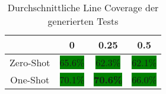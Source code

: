 \bgroup
\def\arraystretch{2}
\begin{table}[H]
	\vspace{.5cm}
	\centering		
	\begin{center}
		\begin{tabular}{|c||c|c|c|}
			\hline 
			& 0 & 0.25 & 0.5 \\
			\hline 
			\hline
			Zero-Shot & \colorbox{green}{65.6\%} & \colorbox{green}{62.3\%} & \colorbox{green}{62.1\%} \\
			\hline
			One-Shot & \colorbox{green}{70.1\%} & \colorbox{green}{\textbf{70.6\%}} & \colorbox{green}{66.0\%} \\
			\hline
		\end{tabular} 
	\end{center}
	\caption{Durchschnittliche Line Coverage der generierten Tests}
	\label{fig:line-avg}
	\vspace{-.8cm}
\end{table}
\egroup